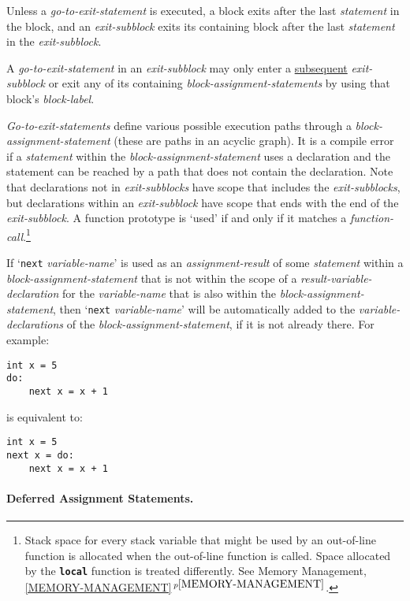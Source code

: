 \documentclass[12pt]{article}
\newcommand{\subsubsubsection}[1]{\paragraph[#1]{#1.}}
\newcommand{\TT}[1]{{\tt \bfseries #1}}
\newcommand{\itemref}[1]{\ref{#1}$\,^{p\pageref{#1}}$}
\newenvironment{indpar}[1][0.3in]%
	{\begin{list}{}%
		     {\setlength{\itemsep}{0in}%
		      \setlength{\topsep}{0in}%
		      \setlength{\parsep}{1ex}%
		      \setlength{\labelwidth}{#1}%
		      \setlength{\leftmargin}{#1}%
		      \addtolength{\leftmargin}{\labelsep}}%
	 \item}%
	{\end{list}}
\begin{document}
Unless a {\em go-to-exit-statement} is executed,
a block exits after the last {\em statement} in the block,
and an {\em exit-subblock} exits its containing block after the last
{\em statement} in the {\em exit-subblock}.

A {\em go-to-exit-statement} in an {\em exit-subblock} may only enter
a \underline{subsequent} {\em exit-subblock} or exit any of its containing
{\em block-assignment-statements} by using that block's {\em block-label}.

{\em Go-to-exit-statements} define various possible execution
paths through a {\em block-assignment-statement}
(these are paths in an acyclic graph).
It is a compile error if a {\em statement}
within the {\em block-assignment-statement}
uses a declaration and the statement can be reached by a path that
does not contain the declaration.
Note that declarations not in {\em exit-subblocks} have scope
that includes the {\em exit-subblocks}, but declarations
within an {\em exit-subblock} have scope that ends with the end of
the {\em exit-subblock}.  A function prototype is `used' if and only if it
matches a {\em function-call}.\footnote{Stack space for every
stack variable that might be used by an out-of-line function is
allocated when the out-of-line function is called.  Space allocated
by the \TT{local} function is treated differently.  See
Memory Management, \itemref{MEMORY-MANAGEMENT}.}

If\label{BLOCK-NEXT-PROMOTION} `{\tt next} {\em variable-name}' is used as an
{\em assignment-result} of some {\em statement} within a
{\em block-assignment-statement} that is not within the scope of
a {\em result-variable-declaration} for the {\em variable-name}
that is also within the {\em block-assignment-statement},
then `{\tt next} {\em variable-name}' will be automatically added
to the {\em variable-declarations} of the {\em block-assignment-statement},
if it is not already there.  For example:
\begin{indpar}\begin{verbatim}
int x = 5
do:
    next x = x + 1
\end{verbatim}\end{indpar}
is equivalent to:
\begin{indpar}\begin{verbatim}
int x = 5
next x = do:
    next x = x + 1
\end{verbatim}\end{indpar}

\subsubsubsection{Deferred Assignment Statements}
\label{DEFERRED-ASSIGNMENT-STATEMENTS}
\end{document}
